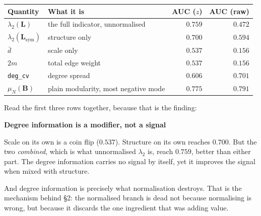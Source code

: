 \documentclass[11pt,a4paper]{article}
\newcommand{\Lap}{\mathbf{L}}
\newcommand{\Bmat}{\mathbf{B}}
\newcommand{\Lsym}{\Lap_{\mathrm{sym}}}
\newenvironment{aside}[1]
 {\par\vspace{2.5mm}\begin{lrbox}{\asidebox}%
  \begin{minipage}{\dimexpr\textwidth-16pt\relax}\small\textbf{#1}\par\vspace{1mm}}
 {\end{minipage}\end{lrbox}%
  \noindent\setlength{\fboxsep}{7pt}\setlength{\fboxrule}{.4pt}%
  \fcolorbox{Rule}{Panel2}{\usebox{\asidebox}}\par\vspace{2.5mm}}
\begin{document}
\begin{center}\small
\renewcommand{\arraystretch}{1.2}
\begin{tabular}{@{}llrr@{}}
\toprule
\textbf{Quantity} & \textbf{What it is} & \textbf{AUC ($z$)} & \textbf{AUC (raw)} \\
\midrule
$\lambda_2(\Lap)$ & the full indicator, unnormalised & $\mathbf{0.759}$ & $0.472$ \\
$\lambda_2(\Lsym)$ & \textcolor{LapC}{structure only} & $0.700$ & $0.594$ \\
$\bar d$ & \textcolor{CorrC}{scale only} & $0.537$ & $0.156$ \\
$2m$ & \textcolor{CorrC}{total edge weight} & $0.537$ & $0.156$ \\
\texttt{deg\_cv} & \textcolor{CorrC}{degree spread} & $0.606$ & $0.701$ \\
\midrule
$\mu_N(\Bmat)$ & \textcolor{ModC}{plain modularity, most negative mode} &
$\mathbf{0.775}$ & $0.791$ \\
\bottomrule
\end{tabular}
\end{center}

Read the first three rows together, because that is the finding:

\begin{aside}{Degree information is a modifier, not a signal}
Scale on its own is a coin flip ($0.537$). Structure on its own reaches $0.700$.
But the two \emph{combined}, which is what unnormalised $\lambda_2$ is, reach
$0.759$, better than either part. The degree information carries no signal by
itself, yet it improves the signal when mixed with structure.

\smallskip
And degree information is precisely what normalisation destroys. That is the
mechanism behind \S2: the normalised branch is dead not because normalising is
wrong, but because it discards the one ingredient that was adding value.
\end{aside}
\end{document}
